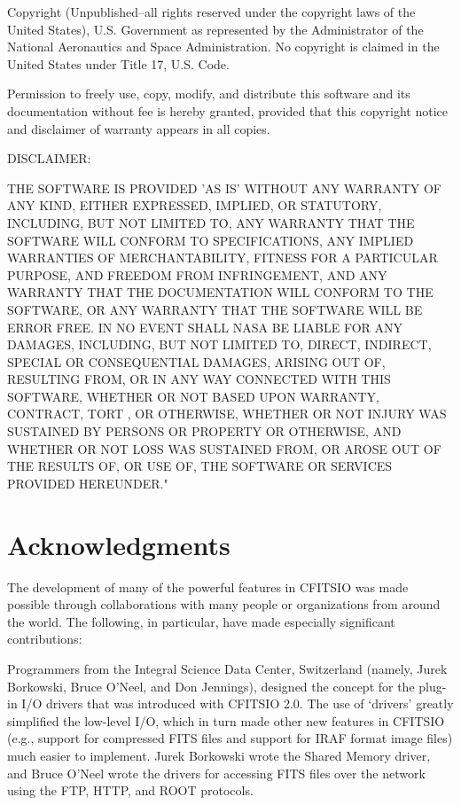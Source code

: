 \documentclass[11pt]{book}
\begin{document}
Copyright (Unpublished--all rights reserved under the copyright laws of
the United States), U.S. Government as represented by the Administrator
of the National Aeronautics and Space Administration.  No copyright is
claimed in the United States under Title 17, U.S. Code.

Permission to freely use, copy, modify, and distribute this software
and its documentation without fee is hereby granted, provided that this
copyright notice and disclaimer of warranty appears in all copies.

DISCLAIMER:

THE SOFTWARE IS PROVIDED 'AS IS' WITHOUT ANY WARRANTY OF ANY KIND,
EITHER EXPRESSED, IMPLIED, OR STATUTORY, INCLUDING, BUT NOT LIMITED TO,
ANY WARRANTY THAT THE SOFTWARE WILL CONFORM TO SPECIFICATIONS, ANY
IMPLIED WARRANTIES OF MERCHANTABILITY, FITNESS FOR A PARTICULAR
PURPOSE, AND FREEDOM FROM INFRINGEMENT, AND ANY WARRANTY THAT THE
DOCUMENTATION WILL CONFORM TO THE SOFTWARE, OR ANY WARRANTY THAT THE
SOFTWARE WILL BE ERROR FREE.  IN NO EVENT SHALL NASA BE LIABLE FOR ANY
DAMAGES, INCLUDING, BUT NOT LIMITED TO, DIRECT, INDIRECT, SPECIAL OR
CONSEQUENTIAL DAMAGES, ARISING OUT OF, RESULTING FROM, OR IN ANY WAY
CONNECTED WITH THIS SOFTWARE, WHETHER OR NOT BASED UPON WARRANTY,
CONTRACT, TORT , OR OTHERWISE, WHETHER OR NOT INJURY WAS SUSTAINED BY
PERSONS OR PROPERTY OR OTHERWISE, AND WHETHER OR NOT LOSS WAS SUSTAINED
FROM, OR AROSE OUT OF THE RESULTS OF, OR USE OF, THE SOFTWARE OR
SERVICES PROVIDED HEREUNDER."


\section{Acknowledgments}

The development of many of the powerful features in CFITSIO was made
possible through collaborations with many people or organizations from
around the world.  The following, in particular, have made especially
significant contributions:

Programmers from the Integral Science Data Center, Switzerland (namely,
Jurek Borkowski, Bruce O'Neel, and Don Jennings), designed the concept
for the plug-in I/O drivers that was introduced with CFITSIO 2.0.  The
use of `drivers' greatly simplified  the low-level I/O, which in turn
made other new features in CFITSIO (e.g., support for compressed FITS
files and support for IRAF format image files) much easier to
implement.  Jurek Borkowski wrote the Shared Memory driver, and Bruce
O'Neel wrote the drivers for accessing FITS files over the network
using the FTP, HTTP, and ROOT protocols.
\end{document}
